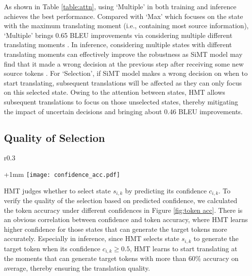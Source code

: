 \documentclass{article} %
\begin{document}
As shown in Table \ref{table:attn}, using `Multiple' in both training and inference achieves the best performance. Compared with `Max' which focuses on the state with the maximum translating moment (i.e., containing most source information), `Multiple' brings 0.65 BLEU improvements via considering multiple different translating moments \citep{zhang-feng-2021-universal}. In inference, considering multiple states with different translating moments can effectively improve the robustness as SiMT model may find that it made a wrong decision at the previous step after receiving some new source tokens \citep{zheng-etal-2020-opportunistic}. For `Selection', if SiMT model makes a wrong decision on when to start translating, subsequent translations will be affected as they can only focus on this selected state. Owing to the attention between states, HMT allows subsequent translations to focus on those unselected states, thereby mitigating the impact of uncertain decisions and bringing about 0.46 BLEU improvements. 

\subsection{Quality of Selection}

\setlength{\columnsep}{10pt}
\begin{wrapfigure}{r}{0.3\textwidth}
\begin{center}
\advance\leftskip+1mm
  \vspace{-0.225in} 
 \texttt{[image: confidence\_acc.pdf]}
   \vspace{-0.05in} 
  \caption{Token accuracy with predicted confidence.}\label{fig:token acc}
\vspace{-0.2in} 
\end{center}
\end{wrapfigure}
HMT judges whether to select state $s_{i,k}$ by predicting its confidence $c_{i,k}$. To verify the quality of the selection based on predicted confidence, we calculated the token accuracy under different confidences in Figure \ref{fig:token acc}. There is an obvious correlation between confidence and token accuracy, where HMT learns higher confidence for those states that can generate the target tokens more accurately. Especially in inference, since HMT selects state $s_{i,k}$ to generate the target token when its confidence $c_{i,k}\!\geq \!0.5$, HMT learns to start translating at the moments that can generate target tokens with more than 60\% accuracy on average, thereby ensuring the translation quality.
\end{document}
